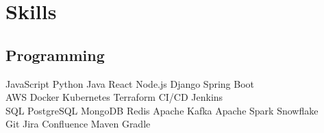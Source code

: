 \documentclass[]{deedy-resume-openfont}
\begin{document}
\begin{minipage}[t]{0.33\textwidth}




\section{Skills}
\subsection{Programming}
JavaScript \textbullet{} Python \textbullet{} Java \textbullet{} React \textbullet{} Node.js \textbullet{} Django \textbullet{} Spring Boot \\
AWS \textbullet{} Docker \textbullet{} Kubernetes \textbullet{} Terraform \textbullet{} CI/CD \textbullet{} Jenkins \\
SQL \textbullet{} PostgreSQL \textbullet{} MongoDB \textbullet{} Redis \textbullet{} Apache Kafka \textbullet{} Apache Spark \textbullet{} Snowflake \\
Git \textbullet{} Jira \textbullet{} Confluence \textbullet{} Maven \textbullet{} Gradle
\sectionsep


\end{minipage}
\end{document}
